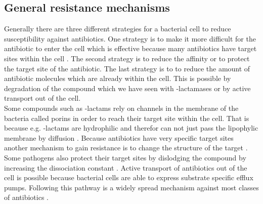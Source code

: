 \subsection{General resistance mechanisms}
Generally there are three different strategies for a bacterial cell to reduce susceptibility against antibiotics. One strategy is to make it more difficult for the antibiotic to enter the cell which is effective because many antibiotics have target sites within the cell \cite{barreteau_cytoplasmic_2008}. The second strategy is to reduce the affinity or to protect the target site of the antibiotic. The last strategy is to  to reduce the amount of antibiotic molecules which are already within the cell. This is possible by degradation of the compound which we have seen with \textbeta-lactamases or by active transport out of the cell.\\
Some compounds such as \textbeta-lactams rely on channels in the membrane of the bacteria called porins in order to reach their target site within the cell. That is because e.g. \textbeta-lactams are hydrophilic and therefor can not just pass the lipophylic membrane by diffusion \cite{munita_mechanisms_2016}. Because antibiotics have very specific target sites another mechanism to gain resistance is to change the structure of the target \cite{munita_mechanisms_2016}. Some pathogens also protect their target sites by dislodging the compound by increasing the dissociation constant \cite{connell_ribosomal_2003}.
Active transport of antibiotics out of the cell is possible because bacterial cells are able to express substrate specific efflux pumps. Following this pathway is a widely spread mechanism against most classes of antibiotics \cite{munita_mechanisms_2016}.

